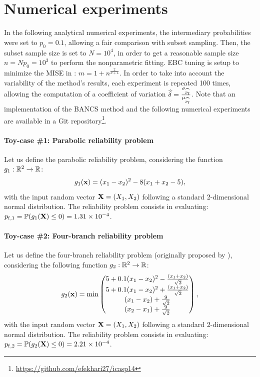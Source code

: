\section{Numerical experiments}
In the following analytical numerical experiments, the intermediary probabilities were set to $p_0=0.1$, allowing a fair comparison with subset sampling. 
Then, the subset sample size is set to $N=10^4$, in order to get a reasonable sample size $n = N p_0 = 10^3$ to perform the nonparametric fitting. 
EBC tuning is setup to minimize the MISE in : $m = 1 + n^{\frac{2}{d+4}}$. 
In order to take into account the variability of the method's results, each experiment is repeated 100 times, allowing the computation of a coefficient of variation $\widehat{\delta} = \frac{\sigma_{\widehat{p_\mathrm{f}}}}{\mu_{\widehat{p_\mathrm{f}}}}$. 
Note that an implementation of the BANCS method and the following numerical experiments are available in a Git repository\footnote{\url{https://github.com/efekhari27/icasp14}}. 

\paragraph{Toy-case \#1: Parabolic reliability problem}

Let us define the parabolic reliability problem, considering the function $g_1: \mathbb{R}^2 \rightarrow \mathbb{R}$:
\begin{equation}
    g_1({\bf x})= (x_1 - x_2) ^ 2 - 8 (x_1 + x_2 - 5),
\end{equation}
with the input random vector ${\bf X} = (X_1, X_2)$ following a standard 2-dimensional normal distribution. 
The reliability problem consists in evaluating: $p_{\mathrm{f}, 1} = \mathbb{P} ( g_1({\bf X}) \leq 0 ) = 1.31 \times 10^{-4}$.

\paragraph{Toy-case \#2: Four-branch reliability problem}

Let us define the four-branch reliability problem (originally proposed by \cite{waarts2000structural}), considering the following function $g_2: \mathbb{R}^2 \rightarrow \mathbb{R}$:
\begin{align}
  g_2({\bf x}) = \min \begin{pmatrix}
    5+0.1(x_1-x_2)^2-\frac{(x_1+x_2)}{\sqrt{2}}\\
    5+0.1(x_1-x_2)^2+\frac{(x_1+x_2)}{\sqrt{2}}\\
    (x_1-x_2)+ \frac{9}{\sqrt{2}}\\
    (x_2-x_1)+ \frac{9}{\sqrt{2}}
  \end{pmatrix},
\end{align}
with the input random vector ${\bf X} = (X_1, X_2)$ following a standard 2-dimensional normal distribution. 
The reliability problem consists in evaluating: $p_{\mathrm{f}, 2} = \mathbb{P} ( g_2({\bf X}) \leq 0 ) =  2.21 \times 10^{-4}$.

